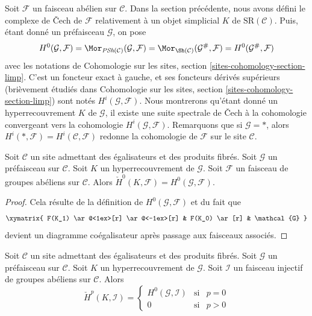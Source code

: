 \medskip\noindent
Soit $\mathcal{F}$ un faisceau abélien sur $\mathcal{C}$.
Dans la section précédente, nous avons défini le complexe de {\v C}ech de $\mathcal{F}$
relativement à un objet simplicial $K$ de $\text{SR}(\mathcal{C})$.
Puis, étant donné un préfaisceau $\mathcal{G}$, on pose
$$
H^0(\mathcal{G}, \mathcal{F}) =
\Mor_{\textit{PSh}(\mathcal{C})}(\mathcal{G}, \mathcal{F}) =
\Mor_{\Sh(\mathcal{C})}(\mathcal{G}^\#, \mathcal{F}) =
H^0(\mathcal{G}^\#, \mathcal{F})
$$
avec les notations de
Cohomologie sur les sites, section \ref{sites-cohomology-section-limp}.
C'est un foncteur exact à gauche, et ses foncteurs dérivés supérieurs
(brièvement étudiés dans
Cohomologie sur les sites, section \ref{sites-cohomology-section-limp})
sont notés $H^i(\mathcal{G}, \mathcal{F})$.
Nous montrerons qu'étant donné un hyperrecouvrement $K$ de $\mathcal{G}$,
il existe une suite spectrale de {\v C}ech à la cohomologie convergeant vers la
cohomologie $H^i(\mathcal{G}, \mathcal{F})$.
Remarquons que si $\mathcal{G} = *$, alors
$H^i(*, \mathcal{F}) = H^i(\mathcal{C}, \mathcal{F})$ redonne
la cohomologie de $\mathcal{F}$ sur le site $\mathcal{C}$.

\begin{lemma}
\label{lemma-h0-cech-variant}
Soit $\mathcal{C}$ un site admettant des égalisateurs et des produits fibrés.
Soit $\mathcal{G}$ un préfaisceau sur $\mathcal{C}$.
Soit $K$ un hyperrecouvrement de $\mathcal{G}$.
Soit $\mathcal{F}$ un faisceau de groupes abéliens sur $\mathcal{C}$.
Alors $\check{H}^0(K, \mathcal{F}) = H^0(\mathcal{G}, \mathcal{F})$.
\end{lemma}

\begin{proof}
Cela résulte de la définition de $H^0(\mathcal{G}, \mathcal{F})$
et du fait que
$$
\xymatrix{
F(K_1) \ar@<1ex>[r] \ar@<-1ex>[r] &
F(K_0) \ar[r] & \mathcal{G}
}
$$
devient un diagramme coégalisateur après passage aux faisceaux associés.
\end{proof}

\begin{lemma}
\label{lemma-injective-trivial-cech-variant}
Soit $\mathcal{C}$ un site admettant des égalisateurs et des produits fibrés.
Soit $\mathcal{G}$ un préfaisceau sur $\mathcal{C}$.
Soit $K$ un hyperrecouvrement de $\mathcal{G}$.
Soit $\mathcal{I}$ un faisceau injectif de groupes abéliens sur $\mathcal{C}$.
Alors
$$
\check{H}^p(K, \mathcal{I}) =
\left\{
\begin{matrix}
H^0(\mathcal{G}, \mathcal{I}) & \text{si} & p = 0 \\
0 & \text{si} & p > 0
\end{matrix}
\right.
$$
\end{lemma}

